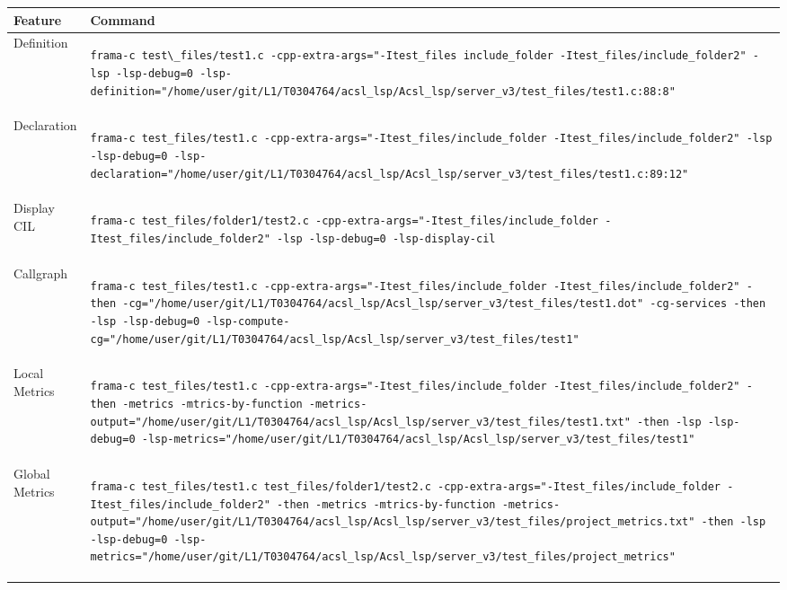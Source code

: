 \documentclass[10pt]{article}
\begin{document}
\begin{singlespace}
\begin{longtable}[H]{|l|p{10cm}|}
		\hline
		\textbf{Feature} &
		\textbf{Command} \\ \hline
		Definition 					& 
\begin{lstlisting}
frama-c test\_files/test1.c -cpp-extra-args="-Itest_files include_folder -Itest_files/include_folder2" -lsp -lsp-debug=0 -lsp-definition="/home/user/git/L1/T0304764/acsl_lsp/Acsl_lsp/server_v3/test_files/test1.c:88:8" 
\end{lstlisting} \\ \hline
		Declaration 				& 
\begin{lstlisting}
frama-c test_files/test1.c -cpp-extra-args="-Itest_files/include_folder -Itest_files/include_folder2" -lsp -lsp-debug=0 -lsp-declaration="/home/user/git/L1/T0304764/acsl_lsp/Acsl_lsp/server_v3/test_files/test1.c:89:12" 
\end{lstlisting} \\ \hline
		Display CIL 				& 
\begin{lstlisting}
frama-c test_files/folder1/test2.c -cpp-extra-args="-Itest_files/include_folder -Itest_files/include_folder2" -lsp -lsp-debug=0 -lsp-display-cil 
\end{lstlisting} \\ \hline
		Callgraph 					& 
\begin{lstlisting}
frama-c test_files/test1.c -cpp-extra-args="-Itest_files/include_folder -Itest_files/include_folder2" -then -cg="/home/user/git/L1/T0304764/acsl_lsp/Acsl_lsp/server_v3/test_files/test1.dot" -cg-services -then -lsp -lsp-debug=0 -lsp-compute-cg="/home/user/git/L1/T0304764/acsl_lsp/Acsl_lsp/server_v3/test_files/test1" 
\end{lstlisting} \\ \hline
		Local Metrics 				& 
\begin{lstlisting}
frama-c test_files/test1.c -cpp-extra-args="-Itest_files/include_folder -Itest_files/include_folder2" -then -metrics -mtrics-by-function -metrics-output="/home/user/git/L1/T0304764/acsl_lsp/Acsl_lsp/server_v3/test_files/test1.txt" -then -lsp -lsp-debug=0 -lsp-metrics="/home/user/git/L1/T0304764/acsl_lsp/Acsl_lsp/server_v3/test_files/test1" 
\end{lstlisting} \\ \hline
		Global Metrics 				& 
\begin{lstlisting}
frama-c test_files/test1.c test_files/folder1/test2.c -cpp-extra-args="-Itest_files/include_folder -Itest_files/include_folder2" -then -metrics -mtrics-by-function -metrics-output="/home/user/git/L1/T0304764/acsl_lsp/Acsl_lsp/server_v3/test_files/project_metrics.txt" -then -lsp -lsp-debug=0 -lsp-metrics="/home/user/git/L1/T0304764/acsl_lsp/Acsl_lsp/server_v3/test_files/project_metrics" 

\end{lstlisting}
\end{longtable}
\end{singlespace}
\end{document}
